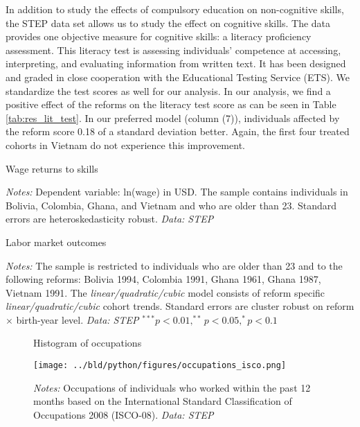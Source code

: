 In addition to study the effects of compulsory education on non-cognitive skills, the STEP data set allows us to study the effect on cognitive skills. The data provides one objective measure for cognitive skills: a literacy proficiency assessment. This literacy test is assessing individuals' competence at accessing, interpreting, and evaluating information from written text. It has been designed and graded in close cooperation with the Educational Testing Service (ETS). We standardize the test scores as well for our analysis. In our analysis, we find a positive effect of the reforms on the literacy test score as can be seen in Table \ref{tab:res_lit_test}. In our preferred model (column (7)), individuals affected by the reform score 0.18 of a standard deviation better. Again, the first four treated cohorts in Vietnam do not experience this improvement.


\begin{table}[htbp]
	\caption{Wage returns to skills}
	\label{tab:wage_returns}
	\begin{center}
		
	\end{center}
	\begin{tablenotes}
		\footnotesize
		\item \textit{Notes:} Dependent variable: ln(wage) in USD. The sample contains individuals in Bolivia, Colombia, Ghana, and Vietnam and who are older than 23. Standard errors are heteroskedasticity robust. \textit{Data: STEP}
	\end{tablenotes}
\end{table}


\begin{table}[htbp]
	\caption{Labor market outcomes}
	\label{tab:lm_outcomes}
	\centering
	\begin{threeparttable}
		\footnotesize
		
		\begin{tablenotes}
			\footnotesize
			\item \textit{Notes:} The sample is restricted to individuals who are older than 23 and to the following reforms: Bolivia 1994, Colombia 1991, Ghana 1961, Ghana 1987, Vietnam 1991. The \textit{linear/quadratic/cubic} model consists of reform specific \textit{linear/quadratic/cubic} cohort trends. Standard errors are cluster robust on reform $\times$ birth-year level. \textit{Data: STEP} $^{***} p < 0.01, ^{**} p < 0.05, ^{*} p < 0.1$
		\end{tablenotes}
	\end{threeparttable}
\end{table}


\begin{figure}[htbp]
	\centering
	\caption{Histogram of occupations}
	\label{fig:occupations}
	\texttt{[image: ../bld/python/figures/occupations\_isco.png]}
	\caption*{\footnotesize \textit{Notes:} Occupations of individuals who worked within the past 12 months based on the International Standard Classification of Occupations 2008 (ISCO-08). \textit{Data: STEP}}
\end{figure}
